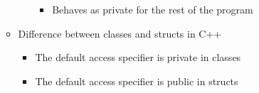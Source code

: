 \begin{itemize}
\begin{itemize}
\begin{itemize}
\begin{itemize}
              \item Behaves as private for the rest of the program

            \end{itemize}

        \end{itemize}

      \item Difference between classes and structs in C++

        \begin{itemize}

          \item The default access specifier is private in classes

          \item The default access specifier is public in structs

        \end{itemize}

    \end{itemize}

\end{itemize}



